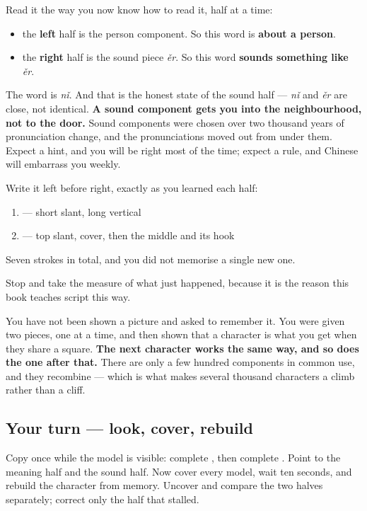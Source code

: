 Read it the way you now know how to read it, half at a time:

\begin{itemize}
\raggedright
  \item the \textbf{left} half is the person component. So this word is \textbf{about a person}.
  \item the \textbf{right} half is the sound piece \emph{ěr}. So this word \textbf{sounds something like} \emph{ěr}.
\end{itemize}

The word is \emph{nǐ}. And that is the honest state of the sound half — \emph{nǐ} and \emph{ěr} are close, not identical. \textbf{A sound component gets you into the neighbourhood, not to the door.} Sound components were chosen over two thousand years of pronunciation change, and the pronunciations moved out from under them. Expect a hint, and you will be right most of the time; expect a rule, and Chinese will embarrass you weekly.

Write it left before right, exactly as you learned each half:

\begin{enumerate}
\raggedright
  \item \textbf{} — short slant, long vertical
  \item \textbf{} — top slant, cover, then the middle and its hook
\end{enumerate}

Seven strokes in total, and you did not memorise a single new one.

\begin{grammarlens}[title={What you've built}]
Stop and take the measure of what just happened, because it is the reason this book teaches script this way.

You have not been shown a picture and asked to remember it. You were given two pieces, one at a time, and then shown that a character is what you get when they share a square. \textbf{The next character works the same way, and so does the one after that.} There are only a few hundred components in common use, and they recombine — which is what makes several thousand characters a climb rather than a cliff.
\end{grammarlens}

\subsection*{Your turn — look, cover, rebuild}
Copy \textbf{} once while the model is visible: complete \textbf{}, then complete \textbf{}. Point to the meaning half and the sound half. Now cover every model, wait ten seconds, and rebuild the character from memory. Uncover and compare the two halves separately; correct only the half that stalled.

